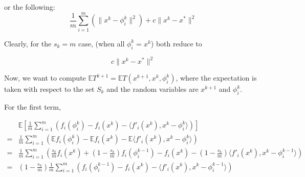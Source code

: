 \documentclass[11pt]{article}
\begin{document}
 or the following:
 \begin{equation}
	 \frac{1}{m}\sum_{i =1}^{m} \left( \| x^k -\phi_i^{k}\|^2  \right) + c \|x^k - x^* \|^2 
 \end{equation}
 
 Clearly, for the $s_k=m$ case, (when all $\phi_i^{k} = x^k$) both reduce to 

 \begin{equation}
	 c \|x^k - x^* \|^2 
 \end{equation}
 

Now, we want to compute $\mathbb{E} T^{k+1} =\mathbb{E} T(x^{k+1}, x^{k}, \phi_i^{k}) $, where the expectation is taken with respect to the set $S_k$ and the random variables are $x^{k+1}$ and $ \phi_i^{k}$.
 

For the first term, 

\begin{align*}
&\mathbb{E} \left[ \frac{1}{m}\sum_{i =1}^{m} \left( f_i(\phi_i^{k}) -  f_i(x^{k}) - \langle f'_i(x^{k}), x^{k} -\phi_i^{k} \rangle  \right) \right] \\
=&\frac{1}{m}\sum_{i =1}^{m} \left( \mathbb{E} f_i(\phi_i^{k}) -  \mathbb{E} f_i(x^{k}) - \mathbb{E} \langle f'_i(x^{k}), x^{k} -\phi_i^{k} \rangle  \right)  \\
=& \frac{1}{m}\sum_{i =1}^{m} \left( \frac{s_k}{m}f_i(x^{k}) + (1-\frac{s_k}{m})f_i(\phi_i^{k-1}) -   f_i(x^{k}) - (1-\frac{s_k}{m})\langle f'_i(x^{k}), x^{k} -\phi_i^{k-1} \rangle  \right)  \\
=&(1-\frac{s_k}{m}) \frac{1}{m}\sum_{i =1}^{m} \left(  f_i(\phi_i^{k-1}) -   f_i(x^{k}) - \langle f'_i(x^{k}), x^{k} -\phi_i^{k-1} \rangle  \right)  \\
\end{align*}
\end{document}
